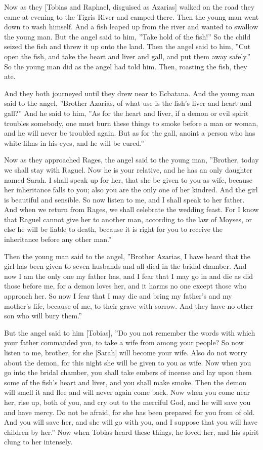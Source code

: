 \documentclass[
]{article}
\newcommand{\RL}[1]{\beginR #1\endR}
\begin{document}
Now as they {[}Tobias and Raphael, disguised as Azarias{]} walked on the
road they came at evening to the Tigris River and camped there. Then the
young man went down to wash himself. And a fish leaped up from the river
and wanted to swallow the young man. But the angel said to him,
\RL{''}Take hold of the fish!'' So the child seized the fish and threw
it up onto the land. Then the angel said to him, \RL{''}Cut open the
fish, and take the heart and liver and gall, and put them away safely.''
So the young man did as the angel had told him. Then, roasting the fish,
they ate.

And they both journeyed until they drew near to Ecbatana. And the young
man said to the angel, \RL{''}Brother Azarias, of what use is the
fish\RL{'}s liver and heart and gall?'' And he said to him, \RL{''}As
for the heart and liver, if a demon or evil spirit troubles somebody,
one must burn these things to smoke before a man or woman, and he will
never be troubled again. But as for the gall, anoint a person who has
white films in his eyes, and he will be cured.''

Now as they approached Rages, the angel said to the young man,
\RL{''}Brother, today we shall stay with Raguel. Now he is your
relative, and he has an only daughter named Sarah. I shall speak up for
her, that she be given to you as wife, because her inheritance falls to
you; also you are the only one of her kindred. And the girl is beautiful
and sensible. So now listen to me, and I shall speak to her father. And
when we return from Rages, we shall celebrate the wedding feast. For I
know that Raguel cannot give her to another man, according to the law of
Moyses, or else he will be liable to death, because it is right for you
to receive the inheritance before any other man.''

Then the young man said to the angel, \RL{''}Brother Azarias, I have
heard that the girl has been given to seven husbands and all died in the
bridal chamber. And now I am the only one my father has, and I fear that
I may go in and die as did those before me, for a demon loves her, and
it harms no one except those who approach her. So now I fear that I may
die and bring my father\RL{'}s and my mother\RL{'}s life, because of me,
to their grave with sorrow. And they have no other son who will bury
them.''

But the angel said to him {[}Tobias{]}, \RL{''}Do you not remember the
words with which your father commanded you, to take a wife from among
your people? So now listen to me, brother, for she {[}Sarah{]} will
become your wife. Also do not worry about the demon, for this night she
will be given to you as wife. Now when you go into the bridal chamber,
you shall take embers of incense and lay upon them some of the
fish\RL{'}s heart and liver, and you shall make smoke. Then the demon
will smell it and flee and will never again come back. Now when you come
near her, rise up, both of you, and cry out to the merciful God, and he
will save you and have mercy. Do not be afraid, for she has been
prepared for you from of old. And you will save her, and she will go
with you, and I suppose that you will have children by her.'' Now when
Tobias heard these things, he loved her, and his spirit clung to her
intensely.
\end{document}
